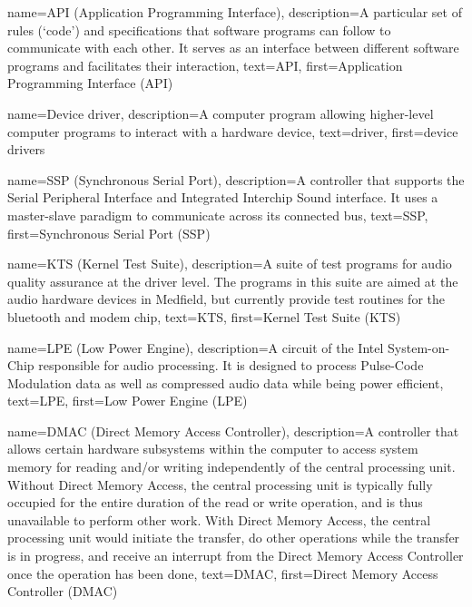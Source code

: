 {
  name=API (Application Programming Interface),
  description={A particular set of rules (`code') and specifications
    that software programs can follow to communicate with each
    other. It serves as an interface between different software
    programs and facilitates their interaction},
  text=API,
  first=Application Programming Interface (API)
}

{
  name=Device driver,
  description={A computer program allowing higher-level computer
    programs to interact with a hardware device},
  text=driver,
  first=device drivers
}

{
  name=SSP (Synchronous Serial Port),
  description={A controller that supports the Serial Peripheral
    Interface and Integrated Interchip Sound interface. It uses a
    master-slave paradigm to communicate across its connected bus},
  text=SSP,
  first=Synchronous Serial Port (SSP)
}


{
  name=KTS (Kernel Test Suite),
  description={A suite of test programs for audio quality assurance at
    the driver level. The programs in this suite are aimed at the
    audio hardware devices in Medfield, but currently provide test
    routines for the bluetooth and modem chip},
  text=KTS,
  first=Kernel Test Suite (KTS)
}


{
  name=LPE (Low Power Engine),
  description={A circuit of the Intel System-on-Chip responsible for
    audio processing. It is designed to process Pulse-Code Modulation
    data as well as compressed audio data while being power efficient},
  text=LPE,
  first=Low Power Engine (LPE)
}

{
  name=DMAC (Direct Memory Access Controller),
  description={A controller that allows certain hardware subsystems
    within the computer to access system memory for reading and/or
    writing independently of the central processing unit. Without
    Direct Memory Access, the central processing unit is typically
    fully occupied for the entire duration of the read or write
    operation, and is thus unavailable to perform other work. With
    Direct Memory Access, the central processing unit would initiate
    the transfer, do other operations while the transfer is in
    progress, and receive an interrupt from the Direct Memory Access
    Controller once the operation has been done},
  text=DMAC,
  first=Direct Memory Access Controller (DMAC)
}


